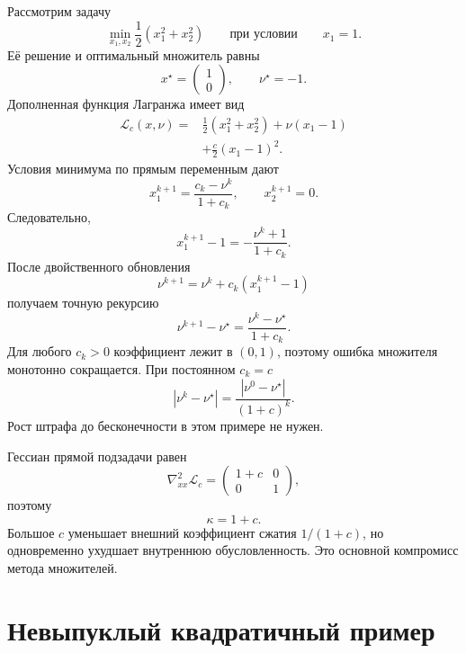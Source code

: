 Рассмотрим задачу
\[
    \min_{x_1,x_2}
    \frac12(x_1^2+x_2^2)
    \qquad
    \text{при условии}
    \qquad
    x_1=1.
\]
Её решение и оптимальный множитель равны
\[
    x^\star=
    \begin{pmatrix}
        1\\
        0
    \end{pmatrix},
    \qquad
    \nu^\star=-1.
\]
Дополненная функция Лагранжа имеет вид
\[
\begin{aligned}
    \mathcal L_c(x,\nu)
    ={}&
    \frac12(x_1^2+x_2^2)
    +
    \nu(x_1-1)
    \\
    &+
    \frac c2(x_1-1)^2.
\end{aligned}
\]
Условия минимума по прямым переменным дают
\[
    x_1^{k+1}
    =
    \frac{c_k-\nu^k}{1+c_k},
    \qquad
    x_2^{k+1}=0.
\]
Следовательно,
\[
    x_1^{k+1}-1
    =
    -\frac{\nu^k+1}{1+c_k}.
\]
После двойственного обновления
\[
    \nu^{k+1}
    =
    \nu^k+c_k(x_1^{k+1}-1)
\]
получаем точную рекурсию
\[
    \nu^{k+1}-\nu^\star
    =
    \frac{\nu^k-\nu^\star}{1+c_k}.
\]
Для любого \(c_k>0\) коэффициент лежит в \((0,1)\), поэтому ошибка
множителя монотонно сокращается. При постоянном \(c_k=c\)
\[
    |\nu^k-\nu^\star|
    =
    \frac{|\nu^0-\nu^\star|}{(1+c)^k}.
\]
Рост штрафа до бесконечности в этом примере не нужен.

Гессиан прямой подзадачи равен
\[
    \nabla^2_{xx}\mathcal L_c
    =
    \begin{pmatrix}
        1+c&0\\
        0&1
    \end{pmatrix},
\]
поэтому
\[
    \kappa=1+c.
\]
Большое \(c\) уменьшает внешний коэффициент сжатия \(1/(1+c)\), но
одновременно ухудшает внутреннюю обусловленность. Это основной
компромисс метода множителей.

\section{Невыпуклый квадратичный пример}

